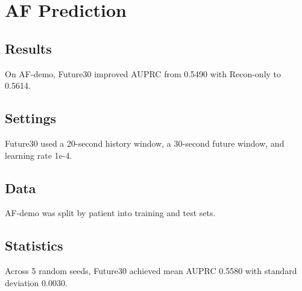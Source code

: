 \documentclass{article}
\begin{document}
\section{AF Prediction}
\subsection{Results}
On AF-demo, Future30 improved AUPRC from 0.5490 with Recon-only to 0.5614.

\subsection{Settings}
Future30 used a 20-second history window, a 30-second future window, and learning rate 1e-4.

\subsection{Data}
AF-demo was split by patient into training and test sets.

\subsection{Statistics}
Across 5 random seeds, Future30 achieved mean AUPRC 0.5580 with standard deviation 0.0030.
\end{document}
